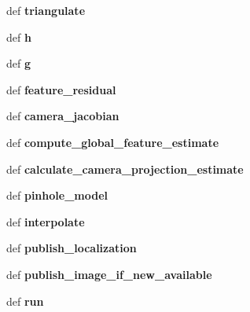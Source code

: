 \begin{DoxyCompactItemize}
\item 
\hypertarget{classmsckf_1_1_msckf_a48162eab93295a3aa9827d02570ecdf3}{def {\bfseries triangulate}}\label{classmsckf_1_1_msckf_a48162eab93295a3aa9827d02570ecdf3}

\item 
\hypertarget{classmsckf_1_1_msckf_a091abe4b54b43f7d11e1ffe2063f7ac9}{def {\bfseries h}}\label{classmsckf_1_1_msckf_a091abe4b54b43f7d11e1ffe2063f7ac9}

\item 
\hypertarget{classmsckf_1_1_msckf_aa923443e7b9f8c18963493b1a910025e}{def {\bfseries g}}\label{classmsckf_1_1_msckf_aa923443e7b9f8c18963493b1a910025e}

\item 
\hypertarget{classmsckf_1_1_msckf_a561f373b33a2c3b7e8b9d6e1e8c95328}{def {\bfseries feature\-\_\-residual}}\label{classmsckf_1_1_msckf_a561f373b33a2c3b7e8b9d6e1e8c95328}

\item 
\hypertarget{classmsckf_1_1_msckf_a67a09f9f462392f3bb707ac698b6ed0e}{def {\bfseries camera\-\_\-jacobian}}\label{classmsckf_1_1_msckf_a67a09f9f462392f3bb707ac698b6ed0e}

\item 
\hypertarget{classmsckf_1_1_msckf_a59f002d186ffda17b1a1dcc8d2a723de}{def {\bfseries compute\-\_\-global\-\_\-feature\-\_\-estimate}}\label{classmsckf_1_1_msckf_a59f002d186ffda17b1a1dcc8d2a723de}

\item 
\hypertarget{classmsckf_1_1_msckf_a45893991d0f6af50e0eb902c6416b623}{def {\bfseries calculate\-\_\-camera\-\_\-projection\-\_\-estimate}}\label{classmsckf_1_1_msckf_a45893991d0f6af50e0eb902c6416b623}

\item 
\hypertarget{classmsckf_1_1_msckf_a0868335826b7b55548236cd06e7a248c}{def {\bfseries pinhole\-\_\-model}}\label{classmsckf_1_1_msckf_a0868335826b7b55548236cd06e7a248c}

\item 
\hypertarget{classmsckf_1_1_msckf_a18e2cb57b56fdc5f7d66b8e36cc067ce}{def {\bfseries interpolate}}\label{classmsckf_1_1_msckf_a18e2cb57b56fdc5f7d66b8e36cc067ce}

\item 
\hypertarget{classmsckf_1_1_msckf_acf89b57822a098ee1a650849a37361eb}{def {\bfseries publish\-\_\-localization}}\label{classmsckf_1_1_msckf_acf89b57822a098ee1a650849a37361eb}

\item 
\hypertarget{classmsckf_1_1_msckf_ab55273376c5e47b07ba919d6486a40b2}{def {\bfseries publish\-\_\-image\-\_\-if\-\_\-new\-\_\-available}}\label{classmsckf_1_1_msckf_ab55273376c5e47b07ba919d6486a40b2}

\item 
\hypertarget{classmsckf_1_1_msckf_a72c2622b8dec25f90ecca34bd759e8af}{def {\bfseries run}}\label{classmsckf_1_1_msckf_a72c2622b8dec25f90ecca34bd759e8af}

\end{DoxyCompactItemize}
